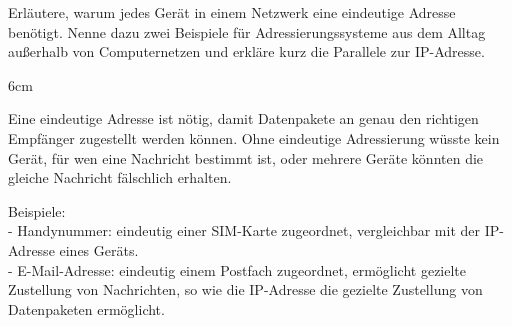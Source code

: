 \question[3]
Erläutere, warum jedes Gerät in einem Netzwerk eine eindeutige Adresse benötigt.
 Nenne dazu zwei Beispiele für Adressierungssysteme aus dem Alltag 
 außerhalb von Computernetzen und erkläre kurz die Parallele zur IP-Adresse.

\begin{solutionbox}{6cm}

Eine eindeutige Adresse ist nötig, damit Datenpakete an genau
den richtigen Empfänger zugestellt werden können. Ohne
eindeutige Adressierung wüsste kein Gerät, für wen eine
Nachricht bestimmt ist, oder mehrere Geräte könnten die
gleiche Nachricht fälschlich erhalten.

Beispiele: \\
- Handynummer: eindeutig einer SIM-Karte zugeordnet,
  vergleichbar mit der IP-Adresse eines Geräts. \\
- E-Mail-Adresse: eindeutig einem Postfach zugeordnet,
  ermöglicht gezielte Zustellung von Nachrichten, so wie die
  IP-Adresse die gezielte Zustellung von Datenpaketen
  ermöglicht.

\end{solutionbox}